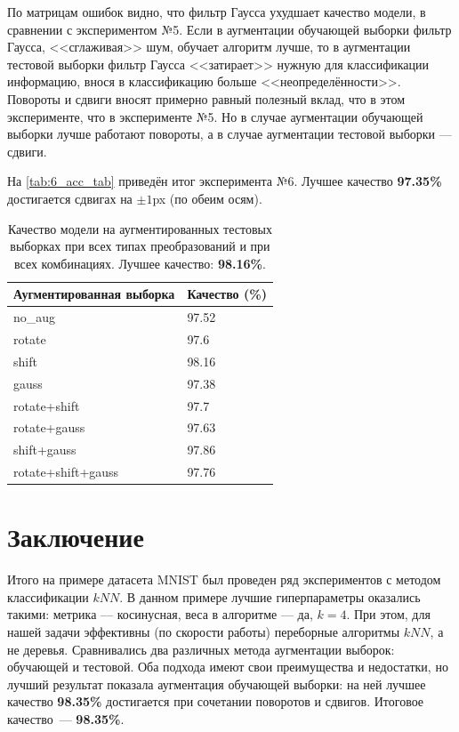 \documentclass[12pt]{article}
\begin{document}
По матрицам ошибок видно, что фильтр Гаусса ухудшает качество модели, в сравнении с экспериментом №5.
Если в аугментации обучающей выборки фильтр Гаусса, <<сглаживая>> шум, обучает алгоритм лучше, то в аугментации тестовой выборки фильтр Гаусса <<затирает>> нужную для классификации информацию, внося в классификацию больше <<неопределённости>>. Повороты и сдвиги вносят примерно равный полезный вклад, что в этом эксперименте, что в эксперименте №5. Но в случае аугментации обучающей выборки лучше работают повороты, а в случае аугментации тестовой выборки --- сдвиги.

На \autoref{tab:6_acc_tab} приведён итог эксперимента №6. Лучшее качество \textbf{97.35\%} достигается сдвигах на $\pm1$px (по обеим осям).
\newpage
\begin{center}
\begin{table}[!h]
    \begin{center}
    \begin{tabular}[!h]{ | l | l | }
    \hline
    Аугментированная выборка & Качество (\%)\\ \hline
    no\_aug & 97.52\\
    rotate & 97.6\\
    shift & 98.16\\
    gauss & 97.38\\
    rotate+shift & 97.7\\
    rotate+gauss & 97.63\\
    shift+gauss & 97.86\\
    rotate+shift+gauss & 97.76\\
    \hline
    \end{tabular}
    \caption{Качество модели на аугментированных тестовых выборках при всех типах преобразований и при всех комбинациях. Лучшее качество: \textbf{98.16\%}.}
    \label{tab:6_acc_tab}
    \end{center}
\end{table}
\end{center}

\section{Заключение}
Итого на примере датасета MNIST был проведен ряд экспериментов с методом классификации $kNN$.
В данном примере лучшие гиперпараметры оказались такими: метрика --- косинусная, веса в алгоритме --- да, $k = 4$. При этом, для нашей задачи эффективны (по скорости работы) переборные алгоритмы $kNN$, а не деревья. Сравнивались два различных метода аугментации выборок: обучающей и тестовой. Оба подхода имеют свои преимущества и недостатки, но лучший результат показала аугментация обучающей выборки: на ней лучшее качество \textbf{98.35\%} достигается при сочетании поворотов и сдвигов. Итоговое качество~--- \textbf{98.35\%}.

\printbibliography
\end{document}
